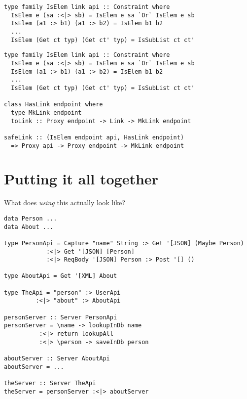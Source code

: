 \documentclass{beamer}
\makeatletter
\newcommand{\verbatimfont}[1]{\renewcommand{\verbatim@font}{\ttfamily#1}}
\makeatother
\begin{document}
\begin{frame}[fragile]
\begin{verbatim}
type family IsElem link api :: Constraint where
  IsElem e (sa :<|> sb) = IsElem e sa `Or` IsElem e sb
  IsElem (a1 :> b1) (a1 :> b2) = IsElem b1 b2
  ...
  IsElem (Get ct typ) (Get ct' typ) = IsSubList ct ct'
\end{verbatim}
\end{frame}


\begin{frame}[fragile]
\begin{verbatim}
type family IsElem link api :: Constraint where
  IsElem e (sa :<|> sb) = IsElem e sa `Or` IsElem e sb
  IsElem (a1 :> b1) (a1 :> b2) = IsElem b1 b2
  ...
  IsElem (Get ct typ) (Get ct' typ) = IsSubList ct ct'

class HasLink endpoint where
  type MkLink endpoint
  toLink :: Proxy endpoint -> Link -> MkLink endpoint

safeLink :: (IsElem endpoint api, HasLink endpoint)
  => Proxy api -> Proxy endpoint -> MkLink endpoint
\end{verbatim}
\end{frame}



\section{Putting it all together} %

\begin{frame}
What does \textit{using} this actually look like?
\end{frame}

\verbatimfont{\footnotesize}%
\begin{frame}[fragile]
\begin{verbatim}
data Person ...
data About ...

type PersonApi = Capture "name" String :> Get '[JSON] (Maybe Person)
            :<|> Get '[JSON] [Person]
            :<|> ReqBody '[JSON] Person :> Post '[] ()

type AboutApi = Get '[XML] About

type TheApi = "person" :> UserApi
         :<|> "about" :> AboutApi

personServer :: Server PersonApi
personServer = \name -> lookupInDb name
          :<|> return lookupAll
          :<|> \person -> saveInDb person

aboutServer :: Server AboutApi
aboutServer = ...

theServer :: Server TheApi
theServer = personServer :<|> aboutServer
\end{verbatim}

\end{frame}
\end{document}
